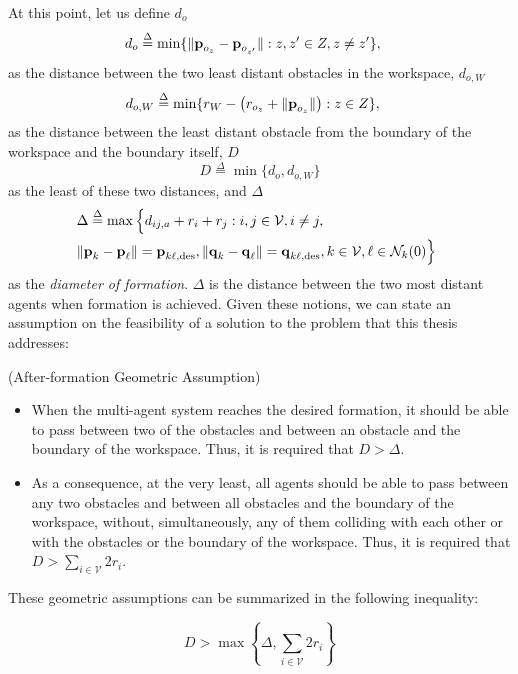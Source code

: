 At this point, let us define $d_o$
\begin{align*}
  d_o &\overset{\Delta}{=} \min\{\| \bm{\mathbf{p}}_{o_z} - \bm{\mathbf{p}}_{o_{z'}}\| : z,z' \in Z, z \neq z' \},
\end{align*}
as the distance between the two least distant obstacles in the workspace,
$d_{o,W}$
\begin{align*}
  d_{o,W} &\overset{\Delta}{=} \min\{r_W - \left( r_{o_z} + \| \bm{\mathbf{p}}_{o_z} \| \right) : z \in Z\},
\end{align*}
as the distance between the least distant obstacle from the boundary of the
workspace and the boundary itself, $D$
\begin{equation*}
  D \overset{\Delta}{=} \min\{d_o, d_{o,W}\}
\end{equation*}
as the least of these two distances, and $\Delta$
\begin{align*}
  &\hspace{-2mm} \Delta \overset{\Delta}{=}  \max\Big\{d_{ij, a}+r_i+r_j: i, j \in \mathcal{V}, i \neq j, \notag \\
  &\hspace{-2mm} \| \vect{p}_k - \vect{p}_\ell \| = \vect{p}_{k \ell,\text{des}},
  \|\vect{q}_k - \vect{q}_\ell\| = \vect{q}_{k \ell,\text{des}},
  k \in \mathcal{V},
  \ell \in \mathcal{N}_k(0)\Big\}
\end{align*}
as the \emph{diameter of formation}. $\Delta$ is the distance between the two
most distant agents when formation is achieved. Given these notions, we
can state an assumption on the feasibility of a solution to the problem
that this thesis addresses:

\begin{gg_box}
\begin{assumption}(After-formation Geometric Assumption)

	\begin{itemize}
		\item When the multi-agent system reaches the desired formation, it should
      be able to pass between two of the obstacles and between an
      obstacle and the boundary of the workspace.
      Thus, it is required that $D > \Delta$.
		\item As a consequence, at the very least, all agents should be able to
      pass between any two obstacles and between all obstacles and the
      boundary of the workspace, without, simultaneously, any of them
      colliding with each other or with the obstacles or the boundary of the
      workspace.
      Thus, it is required that $D >  \sum_{i \in \mathcal{V}}^{} 2r_i$.
	\end{itemize}

	These geometric assumptions can be summarized in the following
  inequality:

	\begin{equation}
    D > \max\left\{\Delta, \sum_{i \in \mathcal{V}}^{} 2r_i \right\}
  \label{eq:geometric_constraint}
	\end{equation}

\label{ass:after_formation_geometry}
\end{assumption}
\end{gg_box}
